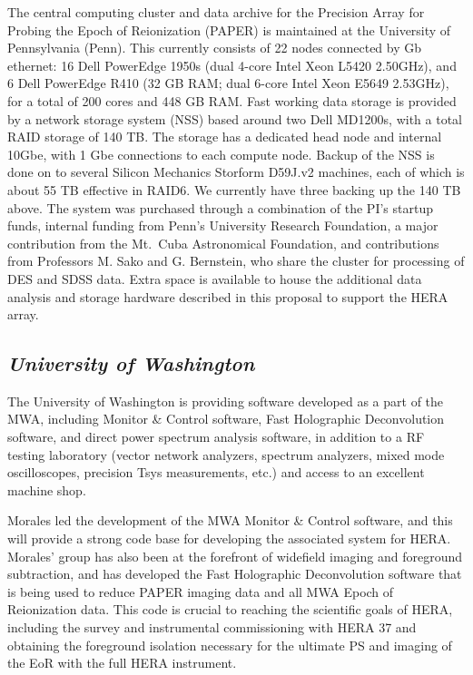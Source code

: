\documentclass[11pt]{article}
\begin{document}
The central computing cluster and data archive for the Precision Array for Probing the Epoch of Reionization (PAPER) is maintained at the University of Pennsylvania (Penn).  This currently consists of 22 nodes connected by Gb ethernet: 16 Dell PowerEdge 1950s (dual 4-core Intel Xeon L5420 \@ 2.50GHz), and 6 Dell PowerEdge R410 (32 GB RAM; dual 6-core Intel Xeon E5649 \@ 2.53GHz), for a total of 200 cores and 448 GB RAM.  Fast working data storage is provided by a network storage system (NSS) based around two Dell MD1200s, with a total RAID storage of 140 TB.  The storage has a dedicated head node and internal 10Gbe, with 1 Gbe connections to each compute node. Backup of the NSS is done on to several Silicon Mechanics Storform D59J.v2 machines, each of which is about 55 TB effective in RAID6.  We currently have three backing up the 140 TB above. The system was purchased through a combination of the PI's startup funds, internal funding from Penn's University Research Foundation, a major contribution from the Mt.~Cuba Astronomical Foundation, and contributions from Professors M. Sako and G. Bernstein, who share the cluster for processing of DES and SDSS data.  Extra space is available to house the additional data analysis and storage hardware described in this proposal to support the HERA array.


\subsection*{\it University of Washington}

The University of Washington is providing software developed as a part of the MWA, including Monitor \& Control software, Fast Holographic Deconvolution software, and direct power spectrum analysis software, in addition to a RF testing laboratory (vector network analyzers, spectrum analyzers, mixed mode oscilloscopes, precision Tsys measurements, etc.) and access to an excellent machine shop.

Morales led the development of the MWA Monitor \& Control software, and this will provide a strong code base for developing the associated system for HERA. Morales' group has also been at the forefront of widefield imaging and foreground subtraction, and has developed the Fast Holographic Deconvolution software that is being used to reduce PAPER imaging data and all MWA Epoch of Reionization data. This code is crucial to reaching the scientific goals of HERA, including the survey and instrumental commissioning with HERA 37 and obtaining the foreground isolation necessary for the ultimate PS and imaging of the EoR with the full HERA instrument.
\end{document}
